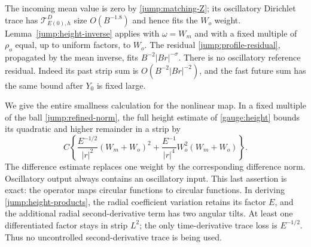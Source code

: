 The incoming mean value is zero by \eqref{jump:matching-Z}; its
oscillatory Dirichlet trace has
$\mathcal T^D_{E(0),h}$ size $O(B^{-1.8})$ and hence fits the
$W_o$ weight.  Lemma~\ref{jump:height-inverse} applies with
$\omega=W_m$ and with a fixed multiple of $\rho_o$ equal, up to
uniform factors, to $W_o$.
The residual \eqref{jump:profile-residual}, propagated by the mean
inverse, fits $B^{-2}|Br|^{-\sigma}$.  There is no oscillatory
reference residual.  Indeed its past strip sum is
$O(B^{-2}|Br|^{-2})$, and the fast future sum has the same bound after
$Y_0$ is fixed large.

We give the entire smallness calculation for the nonlinear map.  In a
fixed multiple of the ball \eqref{jump:refined-norm}, the full height
estimate of \cref{gauge:height} bounds its quadratic and higher
remainder in a strip by
\begin{equation}\label{jump:height-products}
 C\left\{\frac{E^{-1/2}}{|r|^2}(W_m+W_o)^2
       +\frac{E^{-1}}{|r|^4}W_o^2(W_m+W_o)\right\}.
\end{equation}
The difference estimate replaces one weight by the corresponding
difference norm.  Oscillatory output always contains an oscillatory
input.  This last assertion is exact: the operator maps circular
functions to circular functions.  In deriving
\eqref{jump:height-products}, the radial coefficient variation retains
its factor $E$, and the additional radial second-derivative term has
two angular tilts.  At least one differentiated factor stays in strip
$L^2$; the only time-derivative trace loss is $E^{-1/2}$.  Thus no
uncontrolled second-derivative trace is being used.

